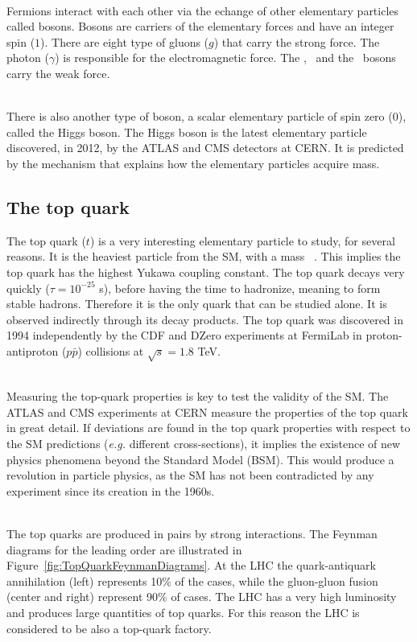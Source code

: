 \ \\Fermions interact with each other via the echange of other elementary particles called bosons. Bosons are carriers of the elementary forces and have an integer spin ($1$). There are eight type of gluons ($g$) that carry the strong force. The photon ($\gamma$) is responsible for the electromagnetic force. The \Wplus, \Wminus~and the \Zzero~bosons carry the weak force. 

\ \\There is also another type of boson, a scalar elementary particle of spin zero (0), called the Higgs boson. The Higgs boson is the latest elementary particle discovered, in 2012, by the ATLAS and CMS detectors at CERN. It is predicted by the mechanism that explains how the elementary particles acquire mass.

\subsection{The top quark}
\label{sec:TopQuark}

The top quark ($t$) is a very interesting elementary particle to study, for several reasons. It is the heaviest particle from the SM, with a mass ~\GeVcc. This implies the top quark has the highest Yukawa coupling constant. The top quark decays very quickly ($\tau=10^{-25}$ s), before having the time to hadronize, meaning to form stable hadrons. Therefore it is the only quark that can be studied alone. It is observed indirectly through its decay products. The top quark was discovered in 1994 independently by the CDF and DZero experiments at FermiLab in proton-antiproton ($p\bar{p}$) collisions at $\sqrt{s}=1.8$ TeV.

\ \\Measuring the top-quark properties is key to test the validity of the SM. The ATLAS and CMS experiments at CERN measure the properties of the top quark in great detail. If deviations are found in the top quark properties with respect to the SM predictions (\emph{e.g.} different cross-sections), it implies the existence of new physics phenomena beyond the Standard Model (BSM). This would produce a revolution in particle physics, as the SM has not been contradicted by any experiment since its creation in the 1960s. 

\ \\The top quarks are produced in pairs by strong interactions. The Feynman diagrams for the leading order are illustrated in Figure~\ref{fig:TopQuarkFeynmanDiagrams}. At the LHC the quark-antiquark annihilation (left) represents 10\% of the cases, while the gluon-gluon fusion (center and right) represent 90\% of cases. The LHC has a very high luminosity and produces large quantities of top quarks. For this reason the LHC is considered to be also a top-quark factory.

